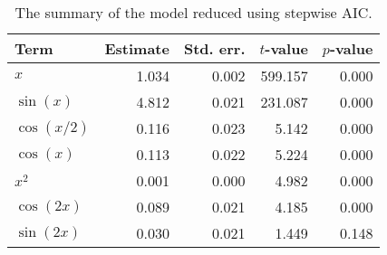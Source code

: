 \begin{table}[!h]

\caption{\label{tab:stepwise-regression}The summary of the model reduced using stepwise \ac{AIC}.}
\centering
\begin{tabular}{lrrrr}
\toprule
Term & Estimate & Std. err. & \(t\)-value & \(p\)-value\\
\midrule
\(x\) & 1.034 & 0.002 & 599.157 & 0.000\\
\(\sin(x)\) & 4.812 & 0.021 & 231.087 & 0.000\\
\(\cos(x/2)\) & 0.116 & 0.023 & 5.142 & 0.000\\
\(\cos(x)\) & 0.113 & 0.022 & 5.224 & 0.000\\
\(x^2\) & 0.001 & 0.000 & 4.982 & 0.000\\
\(\cos(2x)\) & 0.089 & 0.021 & 4.185 & 0.000\\
\(\sin(2x)\) & 0.030 & 0.021 & 1.449 & 0.148\\
\bottomrule
\end{tabular}
\end{table}